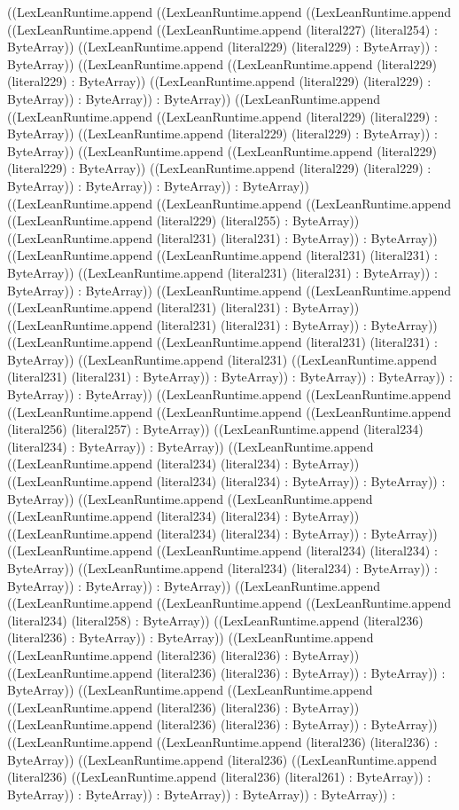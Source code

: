 \documentclass[11pt]{article}
\begin{document}
((LexLeanRuntime.append ((LexLeanRuntime.append ((LexLeanRuntime.append ((LexLeanRuntime.append ((LexLeanRuntime.append (literal227) (literal254) : ByteArray)) ((LexLeanRuntime.append (literal229) (literal229) : ByteArray)) : ByteArray)) ((LexLeanRuntime.append ((LexLeanRuntime.append (literal229) (literal229) : ByteArray)) ((LexLeanRuntime.append (literal229) (literal229) : ByteArray)) : ByteArray)) : ByteArray)) ((LexLeanRuntime.append ((LexLeanRuntime.append ((LexLeanRuntime.append (literal229) (literal229) : ByteArray)) ((LexLeanRuntime.append (literal229) (literal229) : ByteArray)) : ByteArray)) ((LexLeanRuntime.append ((LexLeanRuntime.append (literal229) (literal229) : ByteArray)) ((LexLeanRuntime.append (literal229) (literal229) : ByteArray)) : ByteArray)) : ByteArray)) : ByteArray)) ((LexLeanRuntime.append ((LexLeanRuntime.append ((LexLeanRuntime.append ((LexLeanRuntime.append (literal229) (literal255) : ByteArray)) ((LexLeanRuntime.append (literal231) (literal231) : ByteArray)) : ByteArray)) ((LexLeanRuntime.append ((LexLeanRuntime.append (literal231) (literal231) : ByteArray)) ((LexLeanRuntime.append (literal231) (literal231) : ByteArray)) : ByteArray)) : ByteArray)) ((LexLeanRuntime.append ((LexLeanRuntime.append ((LexLeanRuntime.append (literal231) (literal231) : ByteArray)) ((LexLeanRuntime.append (literal231) (literal231) : ByteArray)) : ByteArray)) ((LexLeanRuntime.append ((LexLeanRuntime.append (literal231) (literal231) : ByteArray)) ((LexLeanRuntime.append (literal231) ((LexLeanRuntime.append (literal231) (literal231) : ByteArray)) : ByteArray)) : ByteArray)) : ByteArray)) : ByteArray)) : ByteArray)) ((LexLeanRuntime.append ((LexLeanRuntime.append ((LexLeanRuntime.append ((LexLeanRuntime.append ((LexLeanRuntime.append (literal256) (literal257) : ByteArray)) ((LexLeanRuntime.append (literal234) (literal234) : ByteArray)) : ByteArray)) ((LexLeanRuntime.append ((LexLeanRuntime.append (literal234) (literal234) : ByteArray)) ((LexLeanRuntime.append (literal234) (literal234) : ByteArray)) : ByteArray)) : ByteArray)) ((LexLeanRuntime.append ((LexLeanRuntime.append ((LexLeanRuntime.append (literal234) (literal234) : ByteArray)) ((LexLeanRuntime.append (literal234) (literal234) : ByteArray)) : ByteArray)) ((LexLeanRuntime.append ((LexLeanRuntime.append (literal234) (literal234) : ByteArray)) ((LexLeanRuntime.append (literal234) (literal234) : ByteArray)) : ByteArray)) : ByteArray)) : ByteArray)) ((LexLeanRuntime.append ((LexLeanRuntime.append ((LexLeanRuntime.append ((LexLeanRuntime.append (literal234) (literal258) : ByteArray)) ((LexLeanRuntime.append (literal236) (literal236) : ByteArray)) : ByteArray)) ((LexLeanRuntime.append ((LexLeanRuntime.append (literal236) (literal236) : ByteArray)) ((LexLeanRuntime.append (literal236) (literal236) : ByteArray)) : ByteArray)) : ByteArray)) ((LexLeanRuntime.append ((LexLeanRuntime.append ((LexLeanRuntime.append (literal236) (literal236) : ByteArray)) ((LexLeanRuntime.append (literal236) (literal236) : ByteArray)) : ByteArray)) ((LexLeanRuntime.append ((LexLeanRuntime.append (literal236) (literal236) : ByteArray)) ((LexLeanRuntime.append (literal236) ((LexLeanRuntime.append (literal236) ((LexLeanRuntime.append (literal236) (literal261) : ByteArray)) : ByteArray)) : ByteArray)) : ByteArray)) : ByteArray)) : ByteArray)) : 
\end{document}
